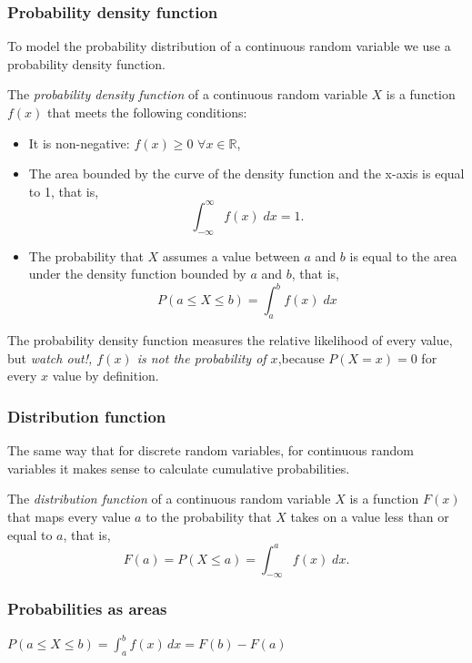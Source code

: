 \begin{frame}
\frametitle{Probability density function}
To model the probability distribution of a continuous random variable we use a probability density function.

\begin{definition}
The \emph{probability density function} of a continuous random variable $X$ is a function $f(x)$ that meets the following conditions:
\begin {itemize}
\item It is non-negative: $f(x)\geq 0$ $\forall x\in \mathbb{R}$,
\item The area bounded by the curve of the density function and the x-axis is equal to 1, that is,
\[
\int_{-\infty}^{\infty} f(x)\; dx = 1.
\]
\item The probability that $X$ assumes a value between $a$ and $b$ is equal to the area under the density function
bounded by $a$ and $b$, that is,
\[
P(a\leq X\leq b) = \int_a^b f(x)\; dx
\]
\end{itemize}
\end{definition}

The probability density function measures the relative likelihood of every value, but \alert{\emph{watch out!, $f(x)$ is not the probability of $x$}},because $P(X=x)=0$ for every $x$ value by definition.
\end{frame}


\begin{frame}
\frametitle{Distribution function}
The same way that for discrete random variables, for continuous random variables it makes sense to calculate cumulative
probabilities.

\begin{definition}
The \emph{distribution function} of a continuous random variable $X$ is a function $F(x)$ that maps every value $a$ to the probability that $X$ takes on a value less than or equal to $a$, that is,
\[
F(a) = P(X\leq a) = \int_{-\infty}^{a} f(x)\; dx.
\]
\end{definition}

\end{frame}


\begin{frame}
\frametitle{Probabilities as areas}

\begin{center}
$\displaystyle P(a\leq X\leq b) = \int_a^b f(x)\, dx = F(b)-F(a)$
\end{center}
\end{frame}



